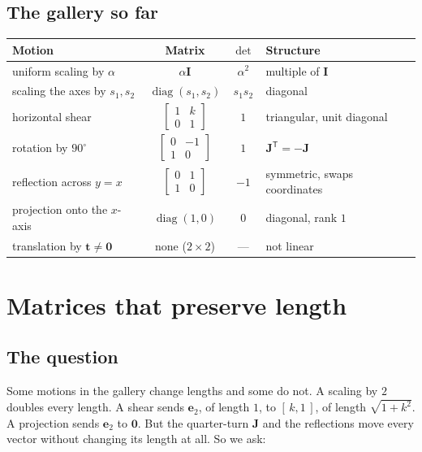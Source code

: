 \documentclass[11pt]{article}
\theoremstyle{plain}
\theoremstyle{definition}
\theoremstyle{remark}
\newcommand{\vc}[1]{\mathbf{#1}}
\newcommand{\mt}[1]{\mathbf{#1}}
\newcommand{\T}{^{\mathsf{T}}}
\DeclareMathOperator{\diagop}{diag}
\newcommand{\smat}[1]{\left[\begin{smallmatrix}#1\end{smallmatrix}\right]}
\begin{document}
\subsection{The gallery so far}
\begin{center}
\renewcommand{\arraystretch}{1.5}
\begin{tabular}{@{}l c c l@{}}
\toprule
\textbf{Motion} & \textbf{Matrix} & $\det$ & \textbf{Structure} \\
\midrule
uniform scaling by $\alpha$ & $\alpha\mt{I}$ & $\alpha^{2}$ & multiple of $\mt{I}$ \\
scaling the axes by $s_1,s_2$ & $\diagop(s_1,s_2)$ & $s_1s_2$ & diagonal \\
horizontal shear & $\smat{1&k\\0&1}$ & $1$ & triangular, unit diagonal \\
rotation by $90^\circ$ & $\smat{0&-1\\1&0}$ & $1$ & $\mt{J}\T=-\mt{J}$ \\
reflection across $y=x$ & $\smat{0&1\\1&0}$ & $-1$ & symmetric, swaps coordinates \\
projection onto the $x$-axis & $\diagop(1,0)$ & $0$ & diagonal, rank $1$ \\
translation by $\vc{t}\neq\vc{0}$ & none ($2\times2$) & --- & not linear \\
\bottomrule
\end{tabular}
\end{center}

\section{Matrices that preserve length}

\subsection{The question}
Some motions in the gallery change lengths and some do not. A scaling by $2$
doubles every length. A shear sends $\vc{e}_2$, of length $1$, to $[\,k,1\,]$,
of length $\sqrt{1+k^{2}}$. A projection sends $\vc{e}_2$ to $\vc{0}$. But the
quarter-turn $\mt{J}$ and the reflections move every vector without changing its
length at all. So we ask:
\end{document}
